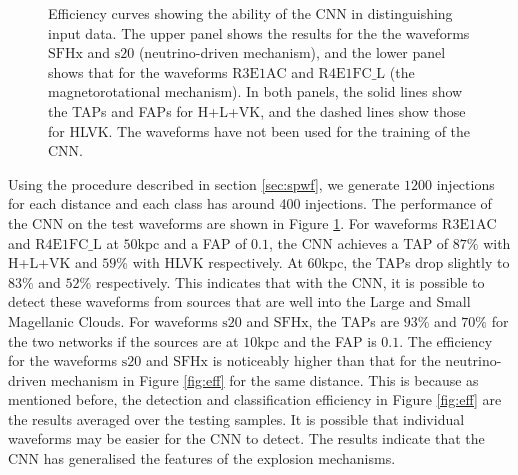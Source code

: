 \documentclass[aps,twocolumn,showpacs,groupedaddress, nofootinbib]{revtex4}  %
\begin{document}
\begin{figure}
     \begin{center}
%
        \quad
%
    \end{center}
    \caption{Efficiency curves showing the ability of the \ac{CNN} in distinguishing input data.
    The upper panel shows the results for the the waveforms $\text{SFHx}$ and $\text{s}20$ (neutrino-driven mechanism), 
    and the lower panel shows that for the waveforms $\text{R3E1AC}$ and $\text{R4E1FC\_L}$ (the magnetorotational mechanism).
    In both panels, the solid lines show the \acp{TAP} and \acp{FAP} for H+L+VK, and the dashed lines show those for HLVK.  
    The waveforms have not been used for the training of the \ac{CNN}.
\label{fig:Extratest}}%
\end{figure}
Using the procedure described in section \ref{sec:spwf}, we generate $1200$ injections for each distance and each class has around 400 injections.
The performance of the \ac{CNN} on the test waveforms are shown in Figure \ref{fig:Extratest}.
For waveforms $\text{R3E1AC}$ and $\text{R4E1FC\_L}$ at $50$kpc and a \ac{FAP} of $0.1$, the \ac{CNN} achieves a \ac{TAP} of $87\%$ with H+L+VK and $59\%$ with HLVK respectively.
At $60$kpc, the \acp{TAP} drop slightly to $83\%$ and $52\%$ respectively.
This indicates that with the \ac{CNN}, it is possible to detect these waveforms from sources that are well into the Large and Small Magellanic Clouds.
For waveforms $\text{s}20$ and $\text{SFHx}$, the \acp{TAP} are $93\%$ and $70\%$ for the two networks if the sources are at $10$kpc and the \ac{FAP} is $0.1$. 
The efficiency for the waveforms $\text{s}20$ and $\text{SFHx}$ is noticeably higher than that for the neutrino-driven mechanism in Figure \ref{fig:eff} for the same distance.
This is because as mentioned before, the detection and classification efficiency in Figure \ref{fig:eff} are the results averaged over the testing samples.
It is possible that individual waveforms may be easier for the \ac{CNN} to detect. The results indicate that the \ac{CNN} has generalised the features of the explosion mechanisms.
\end{document}
